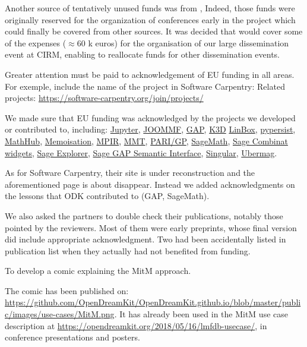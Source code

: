Another source of tentatively unused funds was from ,
Indeed, those funds were originally reserved for the organization of
conferences early in the project which could finally be covered from
other sources. It was decided that  would cover some of
the expenses ($\approx$60 k euros) for the organisation of our large
dissemination event at CIRM, enabling  to reallocate funds
for other dissemination events.

\begin{recommendation}
  Greater attention must be paid to acknowledgement of EU funding in
  all areas. For exemple, include the name of the project in Software
  Carpentry: Related projects:
  \url{https://software-carpentry.org/join/projects/}
\end{recommendation}

We made sure that EU funding was acknowledged by the projects we
developed or contributed to, including:
\href{https://jupyter.org/about}{Jupyter},
\href{http://joommf.github.io/}{JOOMMF},
\href{https://www.gap-system.org/Contacts/funding.html}{GAP},
\href{https://github.com/K3D-tools/K3D-jupyter}{K3D}
\href{https://linalg.org/support.html}{LinBox},
\href{https://pypersist.readthedocs.io/}{pypersist},
\href{https://mathhub.info/}{MathHub},
\href{https://gap-packages.github.io/Memoisation/}{Memoisation},
\href{http://www.mpir.org/news.html}{MPIR},
\href{https://uniformal.github.io//doc/}{MMT},
\href{https://pari.math.u-bordeaux.fr/funding.html}{PARI/GP},
\href{https://www.sagemath.org/development-ack.html}{SageMath},
\href{https://github.com/sagemath/sage-combinat-widgets}{Sage Combinat widgets},
\href{https://github.com/sagemath/sage-explorer}{Sage Explorer},
\href{https://github.com/nthiery/sage-gap-semantic-interface}{Sage GAP Semantic Interface},
\href{https://www.singular.uni-kl.de/index.php/background/funding.html}{Singular},
\href{https://ubermag.github.io/}{Ubermag}.

As for Software Carpentry, their site is under reconstruction and the
aforementioned page is about disappear. Instead we added
acknowledgments on the lessons that ODK contributed to (GAP,
SageMath).

We also asked the partners to double check their publications, notably
those pointed by the reviewers. Most of them were early preprints,
whose final version did include appropriate acknowledgment. Two had
been accidentally listed in \ODK publication list when they actually
had not benefited from \ODK funding.

\begin{recommendation}
  To develop a comic explaining the MitM approach.
\end{recommendation}
The comic has been published on:
\url{https://github.com/OpenDreamKit/OpenDreamKit.github.io/blob/master/public/images/use-cases/MitM.png}. It
has already been used in the MitM use case description at
\url{https://opendreamkit.org/2018/05/16/lmfdb-usecase/}, in conference presentations and
posters.

